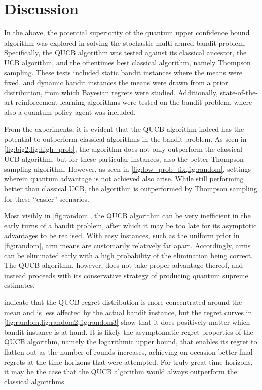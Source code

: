 \section{Discussion}
In the above, the potential superiority of the quantum upper confidence bound algorithm was explored in solving the stochastic multi-armed bandit problem.
Specifically, the QUCB algorithm was tested against its classical ancestor, the UCB algorithm, and the oftentimes best classical algorithm, namely Thompson sampling.
These tests included static bandit instances where the means were fixed, and dynamic bandit instances the means were drawn from a prior distribution, from which Bayesian regrets were studied.
Additionally, state-of-the-art reinforcement learning algorithms were tested on the bandit problem, where also a quantum policy agent was included.

From the experiments, it is evident that the QUCB algorithm indeed has the potential to outperform classical algorithms in the bandit problem.
As seen in \cref{fig:big2,fig:high_prob}, the algorithm does not only outperform the classical UCB algorithm, but for these particular instances, also the better Thompson sampling algorithm.
However, as seen in \cref{fig:low_prob_fix,fig:random}, settings wherein quantum advantage is not achieved also arise.
While still performing better than classical UCB, the algorithm is outperformed by Thompson sampling for these \enquote{easier} scenarios.

Most visibly in \cref{fig:random}, the QUCB algorithm can be very inefficient in the early turns of a bandit problem, after which it may be too late for its asymptotic advantages to be realised.
With easy instances, such as the uniform prior in \cref{fig:random}, arm means are customarily relatively far apart.
Accordingly, arms can be eliminated early with a high probability of the elimination being correct.
The QUCB algorithm, however, does not take proper advantage thereof, and instead proceeds with its conservative strategy of producing quantum supreme estimates.

 indicate that the QUCB regret distribution is more concentrated around the mean and is less affected by the actual bandit instance, but the regret curves in \cref{fig:random,fig:random2,fig:random3} show that it does positively matter which bandit instance is at hand.
It is likely the asymptomatic regret properties of the QUCB algorithm, namely the logarithmic upper bound, that enables its regret to flatten out as the number of rounds increases, achieving on occasion better final regrets at the time horizons that were attempted.
For truly great time horizons, it may be the case that the QUCB algorithm would always outperform the classical algorithms.

